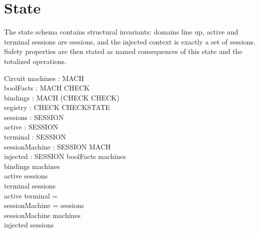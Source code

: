 \documentclass[a4paper,10pt,fleqn]{article}
\begin{document}
\section{State}

The state schema contains structural invariants: domains line up, active and
terminal sessions are sessions, and the injected context is exactly a set of
sessions. Safety properties are then stated as named consequences of this state
and the totalized operations.

\begin{schema}{Circuit}
  machines : \power MACH \\
  boolFacts : MACH \pfun \power CHECK \\
  bindings : MACH \pfun (CHECK \pfun CHECK) \\
  registry : CHECK \pfun CHECKSTATE \\
  sessions : \power SESSION \\
  active : \power SESSION \\
  terminal : \power SESSION \\
  sessionMachine : SESSION \pfun MACH \\
  injected : \power SESSION
\where
  \dom boolFacts \subseteq machines \\
  \dom bindings \subseteq machines \\
  active \subseteq sessions \\
  terminal \subseteq sessions \\
  active \cap terminal = \emptyset \\
  \dom sessionMachine = sessions \\
  \ran sessionMachine \subseteq machines \\
  injected \subseteq sessions
\end{schema}
\end{document}
